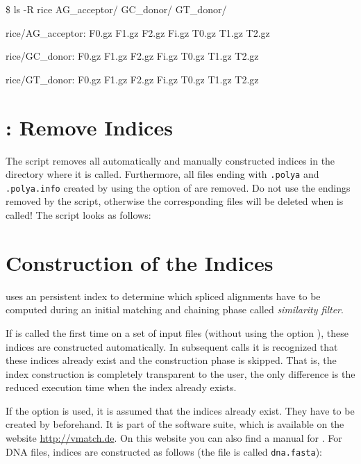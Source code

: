 \documentclass[11pt,a4paper,titlepage]{article}
\begin{document}
\begin{LargeOutput}
\$ ls -R rice
AG\_acceptor/ GC\_donor/    GT\_donor/

rice/AG\_acceptor:
F0.gz  F1.gz  F2.gz  Fi.gz  T0.gz  T1.gz  T2.gz

rice/GC\_donor:
F0.gz  F1.gz  F2.gz  Fi.gz  T0.gz  T1.gz  T2.gz

rice/GT\_donor:
F0.gz  F1.gz  F2.gz  Fi.gz  T0.gz  T1.gz  T2.gz
\end{LargeOutput}

\section{\Callgthclean: Remove Indices}
\label{Gthcleansection}

The script \Callgthclean removes all automatically and manually constructed
indices in the directory where it is called. Furthermore, all files ending with
\texttt{.polya} and \texttt{.polya.info} created by using the option
 of \Callgth are removed. Do not use the endings
removed by the script, otherwise the corresponding files will be deleted when
\Callgthclean is called! The script looks as follows:

\begin{scriptsize}

\end{scriptsize}



\section{Construction of the Indices}
\label{indexconstruction}

\Gth uses an persistent index to determine which spliced alignments have to be computed during an initial matching and chaining phase called \emph{similarity filter}.

If \Callgth is called the first time on a set of input files (without using the option ), these indices are constructed automatically.
In subsequent calls it is recognized that these indices already exist and the construction phase is skipped. That is, the index construction is completely transparent to the user, the only difference is the reduced execution time when the index already exists.

If the option  is used, it is assumed that the indices already exist. They have to be created by \callmkvtree beforehand.
It is part of the \vmatch software suite, which is available on
the website \url{http://vmatch.de}.
On this website you can also find a manual for \callmkvtree.
For DNA files, indices are constructed as follows (the file is called \texttt{dna.fasta}):
\end{document}
